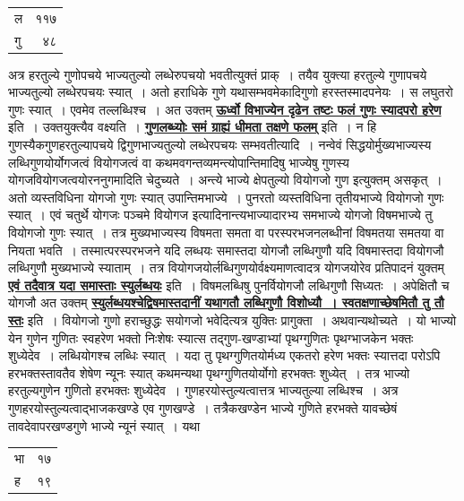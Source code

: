 \documentclass[11pt, openany]{book}
\begin{document}
{{\begin{table}[h!]
    \centering\s
    \begin{tabular}{lr}
         ल &११७\\
गु &४८
    \end{tabular}
\end{table}
\newpage
\noindent अत्र हरतुल्ये गुणोपचये भाज्यतुल्यो लब्धेरुपचयो भवतीत्युक्तं प्राक्~।
तयैव युक्त्या हरतुल्ये गुणापचये भाज्यतुल्यो लब्धेरपचयः स्यात्~। अतो हराधिके
गुणे यथासम्भवमेकादिगुणो हरस्तस्मादपनेयः~। स लघुतरो गुणः स्यात्~। एवमेव 
तल्लब्धिश्च~। अत उक्तम् \hyperref[51]{\textbf{ऊर्ध्वो विभाज्येन दृढेन तष्टः फलं गुणः
स्यादपरो हरेण}} इति~। उक्तयुक्त्यैव वक्ष्यति~। \hyperref[55]{\textbf{गुणलब्ध्योः समं ग्राह्यं धीमता तक्षणे फलम्}} इति~। न हि गुणस्यैकगुणहरतुल्यापचये द्विगुणभाज्यतुल्यो लब्धेरपचयः
सम्भवतीत्यादि~। नन्वेवं सिद्धयोर्मुख्यभाज्यस्य लब्धिगुणयोर्योगजत्वं
वियोगजत्वं वा कथमवगन्तव्यमन्त्योपान्तिमादिषु भाज्येषु गुणस्य
योगजवियोगजत्वयोरननुगमादिति 
चेदुच्यते~। अन्त्ये भाज्ये क्षेपतुल्यो वियोगजो गुण इत्युक्तम् असकृत्~। अतो
व्यस्तविधिना योगजो गुणः स्यात् उपान्तिमभाज्ये~। पुनरतो व्यस्तविधिना
तृतीयभाज्ये वियोगजो गुणः स्यात्~। एवं चतुर्थे योगजः पञ्चमे वियोगज
इत्यादिनान्त्यभाज्यादारभ्य समभाज्ये योगजो विषमभाज्ये तु वियोगजो गुणः स्यात्~। 
तत्र मुख्यभाज्यस्य विषमता समता वा परस्परभजनलब्धीनां विषमतया समतया वा 
नियता भवति~। तस्मात्परस्परभजने यदि लब्धयः समास्तदा योगजौ लब्धिगुणौ 
यदि विषमास्तदा वियोगजौ लब्धिगुणौ मुख्यभाज्ये स्याताम्~। तत्र
वियोगजयोर्लब्धिगुणयोर्वक्ष्यमाणत्वादत्र योगजयोरेव प्रतिपादनं युक्तम्
\hyperref[52]{\textbf{एवं तदैवात्र यदा समास्ताः स्युर्लब्धयः}} इति~। विषमलब्धिषु पुनर्वियोगजौ लब्धिगुणौ सिध्यतः~।
अपेक्षितौ च योगजौ अत उक्तम् \hyperref[52]{\textbf{स्युर्लब्धयश्चेद्विषमास्तदानीं यथागतौ लब्धिगुणौ विशोध्यौ~। स्वतक्षणाच्छेषमितौ तु तौ स्तः}} इति~। वियोगजो गुणो 
हराच्छुद्धः सयोगजो भवेदित्यत्र युक्तिः प्रागुक्ता~। अथवान्यथोच्यते~। यो भाज्यो येन
गुणेन गुणितः स्वहरेण भक्तो निःशेषः स्यात्स तद्गुण-खण्डाभ्यां पृथग्गुणितः 
पृथग्भाजकेन भक्तः शुध्येदेव~। लब्धियोगश्च लब्धिः स्यात्~। यदा तु
पृथग्गुणितयोर्मध्य एकतरो हरेण भक्तः स्यात्तदा परोऽपि हरभक्तस्तावतैव शेषेण न्यूनः
स्यात् कथमन्यथा पृथग्गुणितयोर्योगो हरभक्तः शुध्येत्~। तत्र भाज्यो
हरतुल्यगुणेन गुणितो हरभक्तः शुध्येदेव~। गुणहरयोस्तुल्यत्वात्तत्र भाज्यतुल्या
लब्धिश्च~। अत्र गुणहरयोस्तुल्यत्वाद्भाजकखण्डे एव गुणखण्डे~। तत्रैकखण्डेन भाज्ये
गुणिते हरभक्ते यावच्छेषं तावदेवापरखण्डगुणे भाज्ये न्यूनं स्यात्~। यथा
\newpage
\begin{table}[h!]
    \centering\s
    \begin{tabular}{lr}
        भा &१७\\
ह &१९
    \end{tabular}
\end{table}
\vspace{-2mm}

}}
\end{document}
